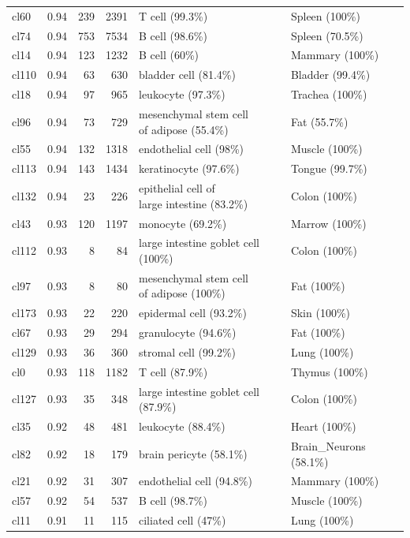 \begin{table}[ht!]
\begin{tabular}{lrrrll}
  cl60 & 0.94 & 239 & 2391 & T cell (99.3\%) & Spleen (100\%) \\ 
  cl74 & 0.94 & 753 & 7534 & B cell (98.6\%) & Spleen (70.5\%) \\ 
  cl14 & 0.94 & 123 & 1232 & B cell (60\%) & Mammary (100\%) \\ 
  cl110 & 0.94 &  63 & 630 & bladder cell (81.4\%) & Bladder (99.4\%) \\ 
  cl18 & 0.94 &  97 & 965 & leukocyte (97.3\%) & Trachea (100\%) \\ 
  cl96 & 0.94 &  73 & 729 & \specialcell[t]{mesenchymal stem cell\\of adipose (55.4\%)} & Fat (55.7\%) \\ 
  cl55 & 0.94 & 132 & 1318 & endothelial cell (98\%) & Muscle (100\%) \\ 
  cl113 & 0.94 & 143 & 1434 & keratinocyte (97.6\%) & Tongue (99.7\%) \\ 
  cl132 & 0.94 &  23 & 226 & \specialcell[t]{epithelial cell of\\large intestine (83.2\%)} & Colon (100\%) \\ 
  cl43 & 0.93 & 120 & 1197 & monocyte (69.2\%) & Marrow (100\%) \\ 
  cl112 & 0.93 &   8 &  84 & large intestine goblet cell (100\%) & Colon (100\%) \\ 
  cl97 & 0.93 &   8 &  80 & \specialcell[t]{mesenchymal stem cell\\of adipose (100\%)} & Fat (100\%) \\ 
  cl173 & 0.93 &  22 & 220 & epidermal cell (93.2\%) & Skin (100\%) \\ 
  cl67 & 0.93 &  29 & 294 & granulocyte (94.6\%) & Fat (100\%) \\ 
  cl129 & 0.93 &  36 & 360 & stromal cell (99.2\%) & Lung (100\%) \\ 
  cl0 & 0.93 & 118 & 1182 & T cell (87.9\%) & Thymus (100\%) \\ 
  cl127 & 0.93 &  35 & 348 & large intestine goblet cell (87.9\%) & Colon (100\%) \\ 
  cl35 & 0.92 &  48 & 481 & leukocyte (88.4\%) & Heart (100\%) \\ 
  cl82 & 0.92 &  18 & 179 & brain pericyte (58.1\%) & Brain\_Neurons (58.1\%) \\ 
  cl21 & 0.92 &  31 & 307 & endothelial cell (94.8\%) & Mammary (100\%) \\ 
  cl57 & 0.92 &  54 & 537 & B cell (98.7\%) & Muscle (100\%) \\ 
  cl11 & 0.91 &  11 & 115 & ciliated cell (47\%) & Lung (100\%) \\ 

\end{tabular}
\end{table}
